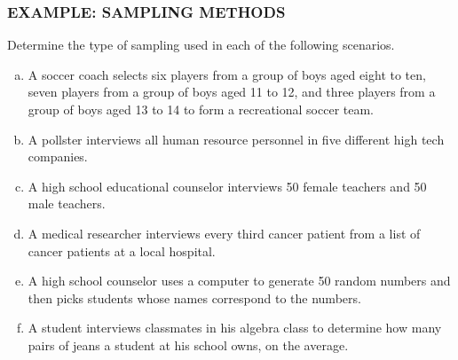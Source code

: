 \documentclass[8pt]{beamer}
\newcommand{\extitle}[1]{\frametitle{\fontfamily{fvs}\selectfont \small\color{black!70!blue!80!cyan}\uppercase{\bfseries Example: #1}}}
\newenvironment{exsol}
{
\begin{tcolorbox}[colframe=black!50!blue!50!cyan,
colback=white,
bottomrule=0mm,
rightrule=0mm,
sharp corners=all] 

}
{ \end{tcolorbox}}
\begin{document}
\begin{frame}
\extitle{Sampling Methods}
Determine the type of sampling used in each of the following scenarios.

\begin{exsol}
\begin{enumerate}[(a)]
\item A soccer coach selects six players from a group of boys aged eight to ten, seven players from a group of boys aged 11 to 12, and three players from a group of boys aged 13 to 14 to form a recreational soccer team.

\item A pollster interviews all human resource personnel in five different high tech companies.

\item A high school educational counselor interviews 50 female teachers and 50 male teachers.

\item A medical researcher interviews every third cancer patient from a list of cancer patients at a local hospital.

\item A high school counselor uses a computer to generate 50 random numbers and then picks students whose names correspond to the numbers.

\item A student interviews classmates in his algebra class to determine how many pairs of jeans a student at his school owns, on the average.
\end{enumerate}
\end{exsol}
\end{frame}
\end{document}
